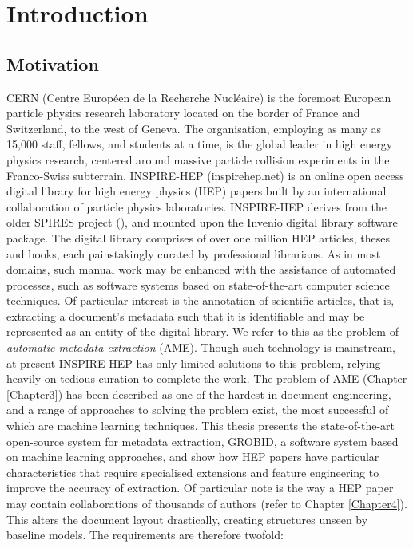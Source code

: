 
\chapter{Introduction} %

\label{Chapter1} %



\section{Motivation}

CERN (Centre Europ\'een de la Recherche Nucl\'eaire) is the foremost European particle physics research laboratory located on the border of France and Switzerland, to the west of Geneva. The organisation, employing as many as 15,000 staff, fellows, and students at a time, is the global leader in high energy physics research, centered around massive particle collision experiments in the Franco-Swiss subterrain. INSPIRE-HEP (inspirehep.net) is an online open access digital library for high energy physics (HEP) papers built by an international collaboration of particle physics laboratories. INSPIRE-HEP derives from the older SPIRES project (\cite{gentil2009information}), and mounted upon the Invenio digital library software package. The digital library comprises of over one million HEP articles, theses and books, each painstakingly curated by professional librarians. As in most domains, such manual work may be enhanced with the assistance of automated processes, such as software systems based on state-of-the-art computer science techniques. Of particular interest is the annotation of scientific articles, that is, extracting a document's metadata such that it is identifiable and may be represented as an entity of the digital library. We refer to this as the problem of \emph{automatic metadata extraction} (AME). Though such technology is mainstream, at present INSPIRE-HEP has only limited solutions to this problem, relying heavily on tedious curation to complete the work. The problem of AME (Chapter \ref{Chapter3}) has been described as one of the hardest in document engineering, and a range of approaches to solving the problem exist, the most successful of which are machine learning techniques. This thesis presents the state-of-the-art open-source system for metadata extraction, GROBID, a software system based on machine learning approaches, and show how HEP papers have particular characteristics that require specialised extensions and feature engineering to improve the accuracy of extraction. Of particular note is the way a HEP paper may contain collaborations of thousands of authors (refer to Chapter \ref{Chapter4}). This alters the document layout drastically, creating structures unseen by baseline models. The requirements are therefore twofold:


